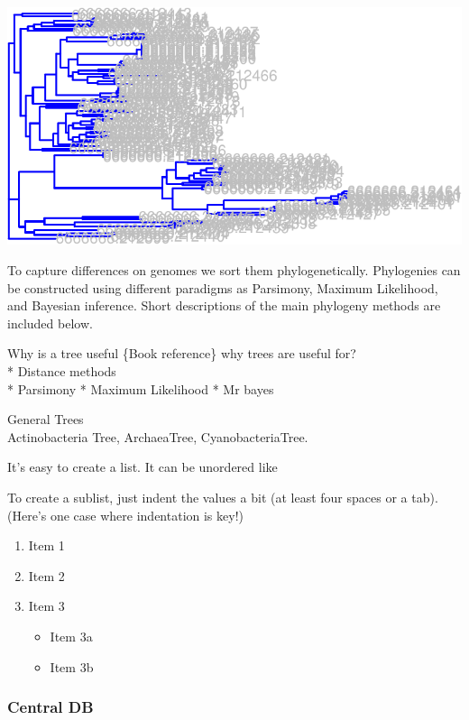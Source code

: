 \documentclass[12pt,twoside]{reedthesis}
\providecommand{\tightlist}{%
  \setlength{\itemsep}{0pt}\setlength{\parskip}{0pt}}
\begin{document}
  \begin{center}\includegraphics{tesis_files/figure-latex/testingPhylogeny-1} \end{center}
  
  To capture differences on genomes we sort them phylogenetically.
  Phylogenies can be constructed using different paradigms as Parsimony,
  Maximum Likelihood, and Bayesian inference. Short descriptions of the
  main phylogeny methods are included below.
  
  Why is a tree useful \{Book reference\} why trees are useful for?\\
  * Distance methods\\
  * Parsimony * Maximum Likelihood * Mr bayes
  
  General Trees\\
  Actinobacteria Tree, ArchaeaTree, CyanobacteriaTree.
  
  It's easy to create a list. It can be unordered like
  
  To create a sublist, just indent the values a bit (at least four spaces
  or a tab). (Here's one case where indentation is key!)
  
  \begin{enumerate}
  \def\labelenumi{\arabic{enumi}.}
  \tightlist
  \item
    Item 1
  \item
    Item 2
  \item
    Item 3
  
    \begin{itemize}
    \tightlist
    \item
      Item 3a
    \item
      Item 3b
    \end{itemize}
  \end{enumerate}
  
  \subsubsection{Central DB}\label{central-db}
  
\end{document}
